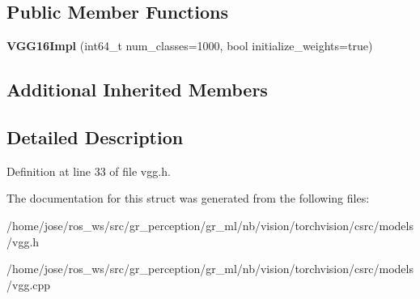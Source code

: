 \subsection*{Public Member Functions}
\begin{DoxyCompactItemize}
\item 
\mbox{\label{structvision_1_1models_1_1VGG16Impl_a6056b020a42ad3a4410b1a827eb19c68}} 
{\bfseries V\+G\+G16\+Impl} (int64\+\_\+t num\+\_\+classes=1000, bool initialize\+\_\+weights=true)
\end{DoxyCompactItemize}
\subsection*{Additional Inherited Members}


\subsection{Detailed Description}


Definition at line 33 of file vgg.\+h.



The documentation for this struct was generated from the following files\+:\begin{DoxyCompactItemize}
\item 
/home/jose/ros\+\_\+ws/src/gr\+\_\+perception/gr\+\_\+ml/nb/vision/torchvision/csrc/models/vgg.\+h\item 
/home/jose/ros\+\_\+ws/src/gr\+\_\+perception/gr\+\_\+ml/nb/vision/torchvision/csrc/models/vgg.\+cpp\end{DoxyCompactItemize}
